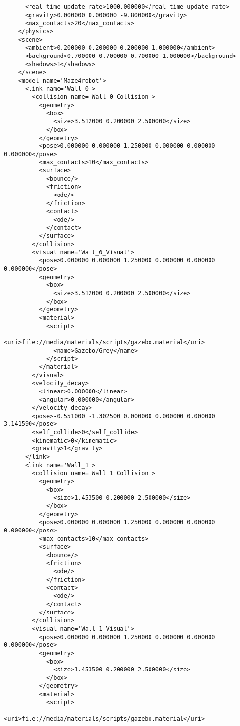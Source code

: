 \begin{lstlisting}
      <real_time_update_rate>1000.000000</real_time_update_rate>
      <gravity>0.000000 0.000000 -9.800000</gravity>
      <max_contacts>20</max_contacts>
    </physics>
    <scene>
      <ambient>0.200000 0.200000 0.200000 1.000000</ambient>
      <background>0.700000 0.700000 0.700000 1.000000</background>
      <shadows>1</shadows>
    </scene>
    <model name='Maze4robot'>
      <link name='Wall_0'>
        <collision name='Wall_0_Collision'>
          <geometry>
            <box>
              <size>3.512000 0.200000 2.500000</size>
            </box>
          </geometry>
          <pose>0.000000 0.000000 1.250000 0.000000 0.000000 0.000000</pose>
          <max_contacts>10</max_contacts>
          <surface>
            <bounce/>
            <friction>
              <ode/>
            </friction>
            <contact>
              <ode/>
            </contact>
          </surface>
        </collision>
        <visual name='Wall_0_Visual'>
          <pose>0.000000 0.000000 1.250000 0.000000 0.000000 0.000000</pose>
          <geometry>
            <box>
              <size>3.512000 0.200000 2.500000</size>
            </box>
          </geometry>
          <material>
            <script>
              <uri>file://media/materials/scripts/gazebo.material</uri>
              <name>Gazebo/Grey</name>
            </script>
          </material>
        </visual>
        <velocity_decay>
          <linear>0.000000</linear>
          <angular>0.000000</angular>
        </velocity_decay>
        <pose>-0.551000 -1.302500 0.000000 0.000000 0.000000 3.141590</pose>
        <self_collide>0</self_collide>
        <kinematic>0</kinematic>
        <gravity>1</gravity>
      </link>
      <link name='Wall_1'>
        <collision name='Wall_1_Collision'>
          <geometry>
            <box>
              <size>1.453500 0.200000 2.500000</size>
            </box>
          </geometry>
          <pose>0.000000 0.000000 1.250000 0.000000 0.000000 0.000000</pose>
          <max_contacts>10</max_contacts>
          <surface>
            <bounce/>
            <friction>
              <ode/>
            </friction>
            <contact>
              <ode/>
            </contact>
          </surface>
        </collision>
        <visual name='Wall_1_Visual'>
          <pose>0.000000 0.000000 1.250000 0.000000 0.000000 0.000000</pose>
          <geometry>
            <box>
              <size>1.453500 0.200000 2.500000</size>
            </box>
          </geometry>
          <material>
            <script>
              <uri>file://media/materials/scripts/gazebo.material</uri>

\end{lstlisting}
